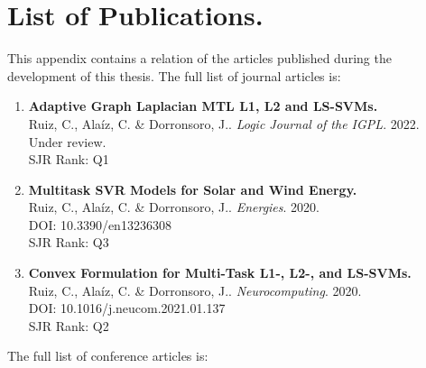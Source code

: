 


\chapter{List of Publications.}
\label{AppendixA}

This appendix contains a relation of the articles published during the development of this thesis.
%
The full list of journal articles is:
\begin{enumerate}
    \item \textbf{Adaptive Graph Laplacian MTL L1, L2 and
    LS-SVMs.}\\
    {Ruiz, C.}, Alaíz, C. \& Dorronsoro, J.. 
    \emph{Logic Journal of the IGPL}. 2022.\\
    Under review.\\
    SJR Rank: Q1
    \item \textbf{Multitask SVR Models for Solar and Wind Energy.}\\
    {Ruiz, C.}, Alaíz, C. \& Dorronsoro, J.. 
    \emph{Energies}. 2020.\\
    DOI: 10.3390/en13236308\\
    SJR Rank: Q3
    \item \textbf{Convex Formulation for Multi-Task L1-, L2-, and LS-SVMs.}\\
    {Ruiz, C.}, Alaíz, C. \& Dorronsoro, J.. 
    \emph{Neurocomputing}. 2020.\\
    DOI: 10.1016/j.neucom.2021.01.137\\
    SJR Rank: Q2
\end{enumerate}
%
The full list of conference articles is:
